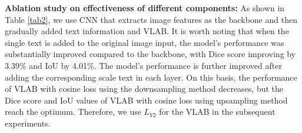 \documentclass{article}
\begin{document}
\begin{table}[!ht]
\centering
\caption{Ablation study on effectiveness of different components on QaTa-COVID dataset.}
\label{tab2}
\vspace{-2mm}
\end{table}

\noindent\textbf{Ablation study on effectiveness of different components: } As shown in Table \ref{tab2}, %
we use CNN that extracts image features as the backbone and then gradually added text information and VLAB. It is worth noting that when the single text is added to the original image input, the model's performance was substantially improved compared to the backbone, with Dice score improving by 3.39\% and IoU by 4.01\%. The model's performance is further improved after adding the corresponding scale text in each layer. On this basis, the performance of VLAB with cosine loss using the downsampling method decreases, but the Dice score and IoU values of VLAB with cosine loss using upsampling method reach the optimum. Therefore, we use $L_{V2}$ for the VLAB in the subsequent experiments.
\vspace{-4mm}
\end{document}
